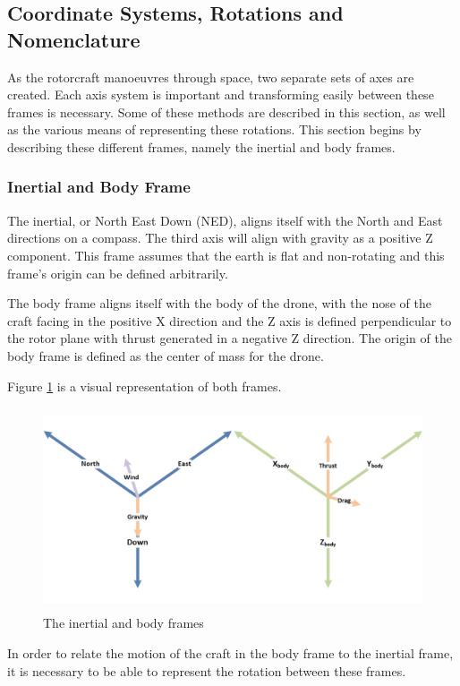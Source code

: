 	\subsection{Coordinate Systems, Rotations and Nomenclature}
	As the rotorcraft manoeuvres through space, two separate sets of axes are created. Each axis system is important and transforming easily between these frames is necessary. Some of these methods are described in this section, as well as the various means of representing these rotations. This section begins by describing these different frames, namely the inertial and body frames.
		
		\subsubsection{Inertial and Body Frame}
		The inertial, or North East Down (NED), aligns itself with the North and East directions on a compass. The third axis will align with gravity as a positive Z component. This frame assumes that the earth is flat and non-rotating and this frame's origin can be defined arbitrarily.
		
		The body frame aligns itself with the body of the drone, with the nose of the craft facing in the positive X direction and the Z axis is defined perpendicular to the rotor plane with thrust generated in a negative Z direction. The origin of the body frame is defined as the center of mass for the drone.
		
		Figure \ref{IM_Frames} is a visual representation of both frames.
		
		\begin{figure}[H]
			\centering
			\includegraphics[height = 6cm]{Images/Literature/AxesOverlay.jpg}     
			\caption{The inertial and body frames}
			\label{IM_Frames}
		\end{figure}
			
		In order to relate the motion of the craft in the body frame to the inertial frame, it is necessary to be able to represent the rotation between these frames.
		
